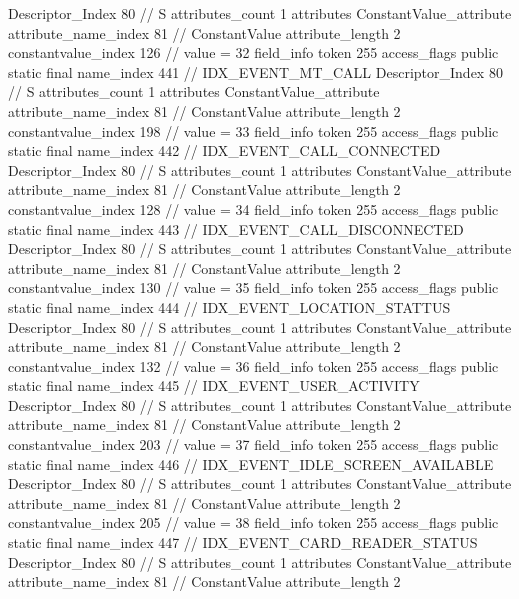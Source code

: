 {{{{{				Descriptor_Index	80		// S
				attributes_count	1
				attributes {
				ConstantValue_attribute {
					attribute_name_index	81		// ConstantValue
					attribute_length	2
					constantvalue_index	126		// value = 32
				}
				}
			}
			field_info {
				token	255
				access_flags	public static final
				name_index	441		// IDX_EVENT_MT_CALL
				Descriptor_Index	80		// S
				attributes_count	1
				attributes {
				ConstantValue_attribute {
					attribute_name_index	81		// ConstantValue
					attribute_length	2
					constantvalue_index	198		// value = 33
				}
				}
			}
			field_info {
				token	255
				access_flags	public static final
				name_index	442		// IDX_EVENT_CALL_CONNECTED
				Descriptor_Index	80		// S
				attributes_count	1
				attributes {
				ConstantValue_attribute {
					attribute_name_index	81		// ConstantValue
					attribute_length	2
					constantvalue_index	128		// value = 34
				}
				}
			}
			field_info {
				token	255
				access_flags	public static final
				name_index	443		// IDX_EVENT_CALL_DISCONNECTED
				Descriptor_Index	80		// S
				attributes_count	1
				attributes {
				ConstantValue_attribute {
					attribute_name_index	81		// ConstantValue
					attribute_length	2
					constantvalue_index	130		// value = 35
				}
				}
			}
			field_info {
				token	255
				access_flags	public static final
				name_index	444		// IDX_EVENT_LOCATION_STATTUS
				Descriptor_Index	80		// S
				attributes_count	1
				attributes {
				ConstantValue_attribute {
					attribute_name_index	81		// ConstantValue
					attribute_length	2
					constantvalue_index	132		// value = 36
				}
				}
			}
			field_info {
				token	255
				access_flags	public static final
				name_index	445		// IDX_EVENT_USER_ACTIVITY
				Descriptor_Index	80		// S
				attributes_count	1
				attributes {
				ConstantValue_attribute {
					attribute_name_index	81		// ConstantValue
					attribute_length	2
					constantvalue_index	203		// value = 37
				}
				}
			}
			field_info {
				token	255
				access_flags	public static final
				name_index	446		// IDX_EVENT_IDLE_SCREEN_AVAILABLE
				Descriptor_Index	80		// S
				attributes_count	1
				attributes {
				ConstantValue_attribute {
					attribute_name_index	81		// ConstantValue
					attribute_length	2
					constantvalue_index	205		// value = 38
				}
				}
			}
			field_info {
				token	255
				access_flags	public static final
				name_index	447		// IDX_EVENT_CARD_READER_STATUS
				Descriptor_Index	80		// S
				attributes_count	1
				attributes {
				ConstantValue_attribute {
					attribute_name_index	81		// ConstantValue
					attribute_length	2
}}}}}}}
